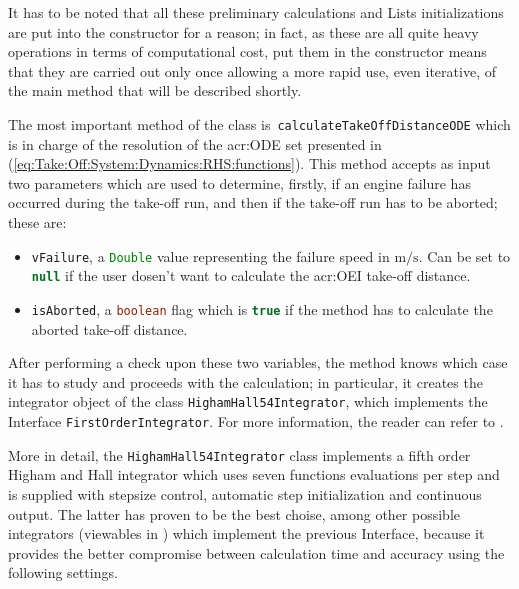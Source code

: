 \bigskip
\noindent
It has to be noted that all these preliminary calculations and \gls{List}s initializations are put into the constructor for a reason; in fact, as these are all quite heavy operations in terms of computational cost, put them in the constructor means that they are carried out only once allowing a more rapid use, even iterative, of the main method that will be described shortly.

\bigskip
\noindent
The most important method of the class is~\lstinline[language=Java]!calculateTakeOffDistanceODE! which is in charge of the resolution of the \gls{acr:ODE} set presented in (\ref{eq:Take:Off:System:Dynamics:RHS:functions}). This method accepts as input two parameters which are used to determine, firstly, if an engine failure has occurred during the take-off run, and then if the take-off run has to be aborted; these are:
%
\begin{itemize}
\item \lstinline[language=Java]!vFailure!, a \lstinline[language=Java]!Double! value representing the failure speed in $\si{\meter\per\second}$. Can be set to \lstinline[language=Java]!null! if the user dosen't want to calculate the \gls{acr:OEI} take-off distance. 
\item \lstinline[language=Java]!isAborted!, a \lstinline[language=Java]!boolean! flag which is \lstinline[language=Java]!true! if the method has to calculate the aborted take-off distance.
\end{itemize}
%
After performing a check upon these two variables, the method knows which case it has to study and proceeds with the calculation; in particular, it creates the integrator object of the class \lstinline[language=Java]!HighamHall54Integrator!, which implements the \gls{Interface} \lstinline[language=Java]!FirstOrderIntegrator!. For more information, the reader can refer to \cite{apache:ode}.

\bigskip
\noindent
More in detail, the \lstinline[language=Java]!HighamHall54Integrator! class implements a fifth order Higham and Hall integrator which uses seven functions evaluations per step and is supplied with stepsize control, automatic step initialization and continuous output. The latter has proven to be the best choise, among other possible integrators (viewables in \cite{apache:FirstOrderIntegrator}) which implement the previous \gls{Interface}, because it provides the better compromise between calculation time and accuracy using the following settings.

